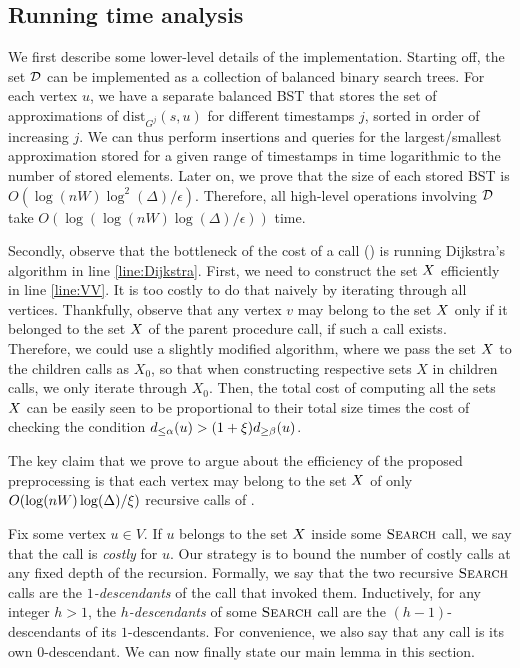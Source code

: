 \documentclass[11pt,letterpaper]{article}
\theoremstyle{plain}
\renewcommand{\O}{O}
\newcommand{\eps}{\ensuremath{\epsilon}}
\newcommand{\dist}{\mathrm{dist}}
\begin{document}
\subsection{Running time analysis}

We first describe some lower-level details of the implementation.
Starting off, the set $\mathcal{D}$ can be implemented as a collection of balanced binary search trees.
For each vertex $u$, we have a separate balanced BST that stores the set of approximations of $\dist_{G^j}(s,u)$ for different timestamps $j$, sorted in order of increasing $j$.
We can thus perform insertions and queries for the largest/smallest approximation stored for a given range of timestamps in time logarithmic to the number of stored elements.
Later on, we prove that the size of each stored BST is $\O(\log(nW) \log^2(\Delta) / \eps)$.
Therefore, all high-level operations involving $\mathcal{D}$ take $\O(\log(\log(nW)\log(\Delta)/\eps))$ time.

Secondly, observe that the bottleneck of the cost of a call  () is running Dijkstra's algorithm in line \ref{line:Dijkstra}.
First, we need to construct the set $X$ efficiently in line \ref{line:VV}.
It is too costly to do that naively by iterating through all vertices.
Thankfully, observe that any vertex $v$ may belong to the set $X$ only if it belonged to the set $X$ of the parent procedure call, if such a call exists.
Therefore, we could use a slightly modified algorithm, where we pass the set $X$ to the children calls as $X_0$, so that when constructing respective sets $X$ in children calls, we only iterate through $X_0$.
Then, the total cost of computing all the sets $X$ can be easily seen to be proportional to their total size times the cost of checking the condition $d_{\le\alpha}(u) > (1 + \xi)d_{\ge\beta}(u)$.

The key claim that we prove to argue about the efficiency of the proposed preprocessing is that each vertex may belong to the set $X$ of only $\O(\log(nW) \log(\Delta) / \epsp)$ recursive calls of .

Fix some vertex $u\in V$.
If $u$ belongs to the set $X$ inside some $\textproc{Search}$ call, we say that the call is \emph{costly} for $u$.
Our strategy is to bound the number of costly calls at any fixed depth of the recursion.
Formally, we say that the two recursive $\textproc{Search}$ calls are the \emph{$1$-descendants} of the call that invoked them.
Inductively, for any integer $h > 1$, the \emph{$h$-descendants} of some $\textproc{Search}$ call are the $(h - 1)$-descendants of its $1$-descendants.
For convenience, we also say that any call is its own $0$-descendant.
We can now finally state our main lemma in this section.
\end{document}
